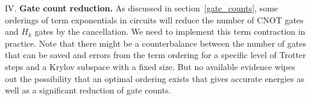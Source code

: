 \documentclass[journal=jctcce,manuscript=article]{achemso}
\begin{document}
IV. \textbf{Gate count reduction.} 
As discussed in section~\ref{gate_counts}, some orderings of term exponentials in circuits will reduce the number of CNOT gates and $H_k$ gates by the cancellation. We need to implement this term contraction in practice. Note that there might be a counterbalance between the number of gates that can be saved and errors from the term ordering for a specific level of Trotter steps and a Krylov subspace with a fixed size. But no available evidence wipes out the possibility that an optimal ordering exists that gives accurate energies as well as a significant reduction of gate counts.



\newpage

{}
\end{document}
